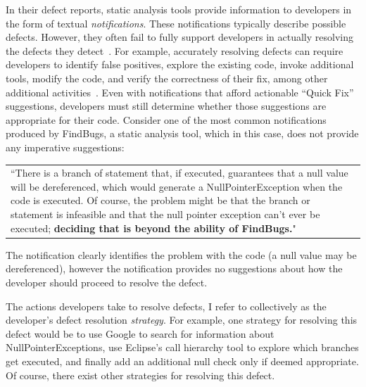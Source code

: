 \documentclass{sig-alternate}
\begin{document}
In their defect reports, static analysis tools provide information to developers in the form of textual \textit{notifications}.
These notifications typically describe possible defects.
However, they often fail to fully support developers in actually resolving the defects they detect~\cite{Johnson2013}.
For example, accurately resolving defects can require developers to identify false positives, explore the existing code, invoke additional tools, modify the code, and verify the correctness of their fix, among other additional activities~\cite{Smith2015}.  
Even with notifications that afford actionable ``Quick Fix'' suggestions, developers must still determine whether those suggestions are appropriate for their code.
Consider one of the most common \cite{Ayewah2007} notifications produced by FindBugs, a static analysis tool, which in this case, does not provide any imperative suggestions:


\vspace{2mm}

\begin{tabular}{|p{7.5cm}}
	``There is a branch of statement that, if executed, guarantees that a null value will be dereferenced, which would generate a NullPointerException when the code is executed. Of course, the problem might be that the branch or statement is infeasible and that the null pointer exception can't ever be executed; \textbf{deciding that is beyond the ability of FindBugs.}"\\
\end{tabular}
\vspace{2mm}

\noindent
The notification clearly identifies the problem with the code (a null value may be dereferenced), however the notification provides no suggestions about how the developer should proceed to resolve the defect. 

The actions developers take to resolve defects, I refer to collectively as the developer's defect resolution \textit{strategy}.
For example, one strategy for resolving this defect would be to use Google to search for information about NullPointerExceptions, use Eclipse's call hierarchy tool to explore which branches get executed, and finally add an additional null check only if deemed appropriate.
Of course, there exist other strategies for resolving this defect.
\end{document}
